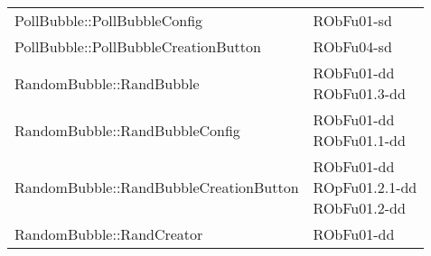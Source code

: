 \begin{center}
\begin{longtable}{|
*{1}{>{\centering\arraybackslash}m{7.5cm}|}
*{1}{>{\centering\arraybackslash}m{2.5cm}|}}
{\\}\\\hline
PollBubble::PollBubbleConfig & \makecell{RObFu01-sd
\\}\\\hline
PollBubble::PollBubbleCreationButton & \makecell{RObFu04-sd
\\}\\\hline
RandomBubble::RandBubble & \makecell{RObFu01-dd
\\RObFu01.3-dd
\\}\\\hline
RandomBubble::RandBubbleConfig & \makecell{RObFu01-dd
\\RObFu01.1-dd
\\}\\\hline
RandomBubble::RandBubbleCreationButton & \makecell{RObFu01-dd
\\ROpFu01.2.1-dd
\\RObFu01.2-dd
\\}\\\hline
RandomBubble::RandCreator & \makecell{RObFu01-dd
\\}\\\hline
\end{longtable}
\end{center}
